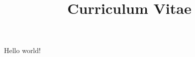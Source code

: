\documentclass[a4paper]{curve}
\title{Curriculum Vitae}
\begin{document}
\makeheaders[c]

\par Hello world!
\end{document}
